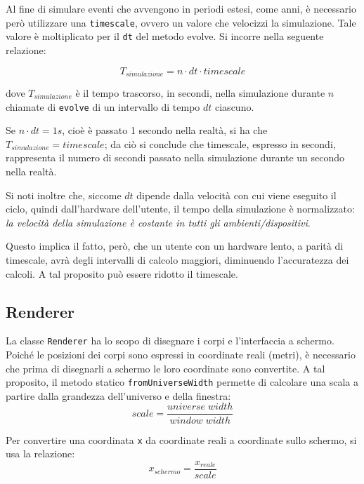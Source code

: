 \documentclass{article}
\begin{document}
Al fine di simulare eventi che avvengono in periodi estesi, come anni, è necessario però utilizzare una \verb|timescale|, ovvero un valore che velocizzi la simulazione. Tale valore è moltiplicato per il \verb|dt| del metodo evolve. Si incorre nella seguente relazione:

\begin{equation*}
    T_{simulazione} = n \cdot dt \cdot timescale
\end{equation*}

dove $T_{simulazione}$ è il tempo trascorso, in secondi, nella simulazione durante $n$ chiamate di \verb|evolve| di un intervallo di tempo $dt$ ciascuno.

 Se $n \cdot dt = 1 s$, cioè è passato 1 secondo nella realtà, si ha che $T_{simulazione} = timescale$; da ciò si conclude che timescale, espresso in secondi, rappresenta il numero di secondi passato nella simulazione durante un secondo nella realtà.

Si noti inoltre che, siccome $dt$ dipende dalla velocità con cui viene eseguito il ciclo, quindi dall'hardware dell'utente, il tempo della simulazione è normalizzato: \textit{la velocità della simulazione è costante in tutti gli ambienti/dispositivi}.

Questo implica il fatto, però, che un utente con un hardware lento, a parità di timescale, avrà degli intervalli di calcolo maggiori, diminuendo l'accuratezza dei calcoli. A tal proposito può essere ridotto il timescale.

\subsection{Renderer}
La classe \verb|Renderer| ha lo scopo di disegnare i corpi e l'interfaccia a schermo. Poiché le posizioni dei corpi sono espressi in coordinate reali (metri), è necessario che prima di disegnarli a schermo le loro coordinate sono convertite. A tal proposito, il metodo statico \verb|fromUniverseWidth| permette di calcolare una scala a partire dalla grandezza dell'universo e della finestra:
\begin{equation*}
    scale = \frac{universe\;width}{window\;width}
\end{equation*}

Per convertire una coordinata \verb|x| da coordinate reali a coordinate sullo schermo, si usa la relazione:
\begin{equation*}
    x_{schermo} = \frac{x_{reale}}{scale}
\end{equation*}
\end{document}
